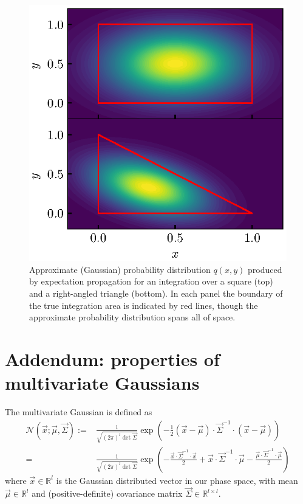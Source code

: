 \documentclass[11pt,twoside]{report}
\begin{document}
\begin{figure}
  \includegraphics[width=0.9\linewidth,outer]{ep-pdf}
  \caption[Approximate probability distribution for integrating areas of simple 2d shapes]{
    Approximate (Gaussian) probability distribution $q(x,y)$ produced by expectation propagation for an integration over a square (top) and a right-angled triangle (bottom).
    In each panel the boundary of the true integration area is indicated by red lines, though the approximate probability distribution spans all of space.
  }
  \label{fig:ep-pdf}
\end{figure}

\section{Addendum: properties of multivariate Gaussians}
\label{sec:gaussian-properties}

The multivariate Gaussian is defined as
\begin{equation}
  \begin{split}
    \mathcal{N}(\vec{x}; \vec{\mu}, \vec{\Sigma})
    :=&
    \frac{1}{\sqrt{ (2\pi)^l \det{\vec{\Sigma}} }}
    \exp{\left(
      - \frac{1}{2} (\vec{x} - \vec{\mu}) \cdot \vec{\Sigma}^{-1} \cdot (\vec{x} - \vec{\mu})
      \right)}
    \\
    =&
    \frac{1}{\sqrt{ (2\pi)^l \det{\vec{\Sigma}} }}
    \exp{\left(
      - \frac{\vec{x} \cdot \vec{\Sigma}^{-1} \cdot \vec{x}}{2}
      + \vec{x} \cdot \vec{\Sigma}^{-1} \cdot \vec{\mu}
      - \frac{\vec{\mu} \cdot \vec{\Sigma}^{-1} \cdot \vec{\mu}}{2}
      \right)}
  \end{split}
\end{equation}
where $\vec{x} \in \mathbb{R}^l$ is the Gaussian distributed vector in our phase space, with mean $\vec{\mu} \in \mathbb{R}^l$ and (positive-definite) covariance matrix $\vec{\Sigma} \in \mathbb{R}^{l \times l}$.
\end{document}

